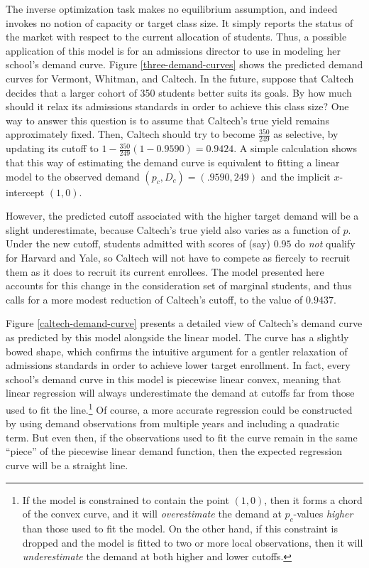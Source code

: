 \documentclass[12pt]{article}
\theoremstyle{definition}
\begin{document}
The inverse optimization task makes no equilibrium assumption, and indeed invokes no notion of capacity or target class size. It simply reports the status of the market with respect to the current allocation of students. Thus, a possible application of this model is for an admissions director to use in modeling her school's demand curve. Figure \ref{three-demand-curves} shows the predicted demand curves for Vermont, Whitman, and Caltech. In the future, suppose that Caltech decides that a larger cohort of 350 students better suits its goals. By how much should it relax its admissions standards in order to achieve this class size? One way to answer this question is to assume that Caltech’s true yield remains approximately fixed. Then, Caltech should try to become $\frac{350}{249}$ as selective, by updating its cutoff to $1 - \frac{350}{249}(1 - 0.9590) = 0.9424$. A simple calculation shows that this way of estimating the demand curve is equivalent to fitting a linear model to the observed demand $(p_c, D_c) = (.9590, 249)$ and the implicit $x$-intercept $(1, 0)$. 

However, the predicted cutoff associated with the higher target demand will be a slight underestimate, because Caltech’s true yield also varies as a function of $p$. Under the new cutoff, students admitted with scores of (say) $0.95$ do \emph{not} qualify for Harvard and Yale, so Caltech will not have to compete as fiercely to recruit them as it does to recruit its current enrollees. The model presented here accounts for this change in the consideration set of marginal students, and thus calls for a more modest reduction of Caltech’s cutoff, to the value of $0.9437$.

Figure \ref{caltech-demand-curve} presents a detailed view of Caltech’s demand curve as predicted by this model alongside the linear model. The curve has a slightly bowed shape, which confirms the intuitive argument for a gentler relaxation of admissions standards in order to achieve lower target enrollment. In fact, every school’s demand curve in this model is piecewise linear convex, meaning that linear regression will always underestimate the demand at cutoffs far from those used to fit the line.\footnote{If the model is constrained to contain the point $(1, 0)$, then it forms a chord of the convex curve, and it will \emph{overestimate} the demand at $p_c$-values \emph{higher} than those used to fit the model. On the other hand, if this constraint is dropped and the model is fitted to two or more local observations, then it will \emph{underestimate} the demand at both higher and lower cutoffs.} Of course, a more accurate regression could be constructed by using demand observations from multiple years and including a quadratic term. But even then, if the observations used to fit the curve remain in the same ``piece'' of the piecewise linear demand function, then the expected regression curve will be a straight line.
\end{document}
